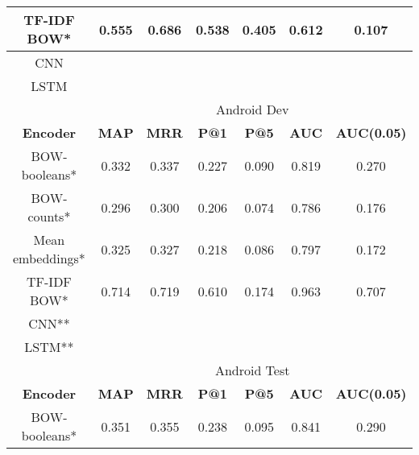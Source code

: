 \documentclass[12pt]{article}
\begin{document}
\begin{center}
\begin{tabular}{|c||c|c|c|c||c|c|}
			\cellcolor{red!15}TF-IDF BOW* & 0.555 & 0.686 & 0.538 & 0.405 & 0.612 & 0.107 \\ \hline\hline
			\cellcolor{green!15}CNN &  &  &  &  &  &  \\ \hline
			\cellcolor{green!15}LSTM &  &  &  &  &  &  \\ \hline
			\hline
			\cellcolor{gray!15}
				& \multicolumn{6}{c|}{\cellcolor{gray!15}Android Dev} \\ \hline
			\cellcolor{gray!15}\textbf{Encoder} & \cellcolor{gray!15}\textbf{MAP} & \cellcolor{gray!15}\textbf{MRR}
				& \cellcolor{gray!15}\textbf{P@1} & \cellcolor{gray!15}\textbf{P@5}
				& \cellcolor{gray!15}\textbf{AUC} & \cellcolor{gray!15}\textbf{AUC(0.05)} \\ \hline\hline
			\cellcolor{red!15}BOW-booleans* & 0.332 & 0.337 & 0.227 & 0.090 & 0.819 & 0.270 \\ \hline
			\cellcolor{red!15}BOW-counts* & 0.296 & 0.300 & 0.206 & 0.074 & 0.786 & 0.176 \\ \hline
			\cellcolor{red!15}Mean embeddings* & 0.325 & 0.327 & 0.218 & 0.086 & 0.797 & 0.172 \\ \hline
			\cellcolor{red!15}TF-IDF BOW* & 0.714 & 0.719 & 0.610 & 0.174 & 0.963 & 0.707 \\ \hline\hline
			\cellcolor{green!15}CNN** &  &  &  &  &  &  \\ \hline
			\cellcolor{green!15}LSTM** &  &  &  &  &  &  \\ \hline
			\hline
			\cellcolor{gray!15}
				& \multicolumn{6}{c|}{\cellcolor{gray!15}Android Test} \\ \hline
			\cellcolor{gray!15}\textbf{Encoder} & \cellcolor{gray!15}\textbf{MAP} & \cellcolor{gray!15}\textbf{MRR}
				& \cellcolor{gray!15}\textbf{P@1} & \cellcolor{gray!15}\textbf{P@5}
				& \cellcolor{gray!15}\textbf{AUC} & \cellcolor{gray!15}\textbf{AUC(0.05)} \\ \hline\hline
			\cellcolor{red!15}BOW-booleans* & 0.351 & 0.355 & 0.238 & 0.095 & 0.841 & 0.290 \\ \hline

\end{tabular}
\end{center}
\end{document}
